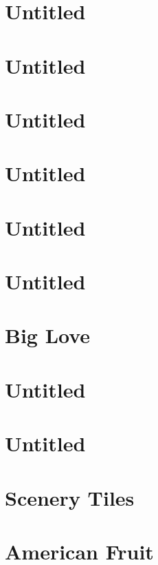\chapter{Untitled}


\chapter{Untitled}


\chapter{Untitled}


\chapter{Untitled}


\chapter{Untitled}


\chapter{Untitled}


\chapter{Big Love}


\chapter{Untitled}


\chapter{Untitled}


\chapter{Scenery Tiles}


\chapter{American Fruit}



